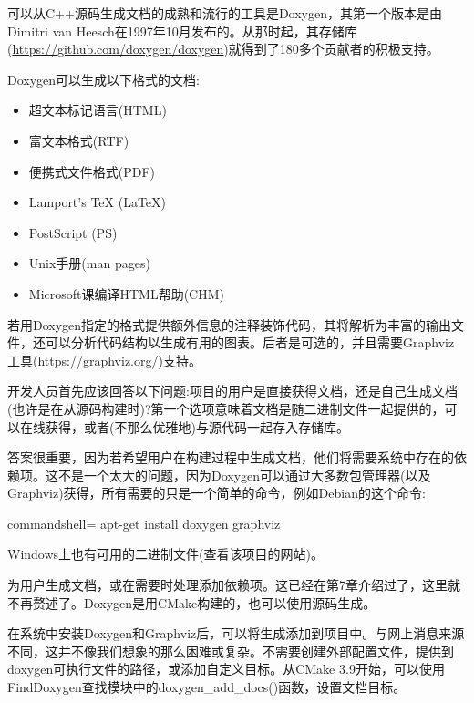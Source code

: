 可以从C++源码生成文档的成熟和流行的工具是Doxygen，其第一个版本是由Dimitri van Heesch在1997年10月发布的。从那时起，其存储库(\url{https://github.com/doxygen/doxygen})就得到了180多个贡献者的积极支持。

Doxygen可以生成以下格式的文档:

\begin{itemize}
\item 
超文本标记语言(HTML)

\item 
富文本格式(RTF)

\item 
便携式文件格式(PDF)

\item 
Lamport's TeX (LaTeX)

\item 
PostScript (PS)

\item 
Unix手册(man pages)

\item 
Microsoft课编译HTML帮助(CHM)
\end{itemize}

若用Doxygen指定的格式提供额外信息的注释装饰代码，其将解析为丰富的输出文件，还可以分析代码结构以生成有用的图表。后者是可选的，并且需要Graphviz工具(\url{https://graphviz.org/})支持。

开发人员首先应该回答以下问题:项目的用户是直接获得文档，还是自己生成文档(也许是在从源码构建时)?第一个选项意味着文档是随二进制文件一起提供的，可以在线获得，或者(不那么优雅地)与源代码一起存入存储库。

答案很重要，因为若希望用户在构建过程中生成文档，他们将需要系统中存在的依赖项。这不是一个太大的问题，因为Doxygen可以通过大多数包管理器(以及Graphviz)获得，所有需要的只是一个简单的命令，例如Debian的这个命令:

\begin{tcblisting}{commandshell={}}
apt-get install doxygen graphviz
\end{tcblisting}

Windows上也有可用的二进制文件(查看该项目的网站)。

为用户生成文档，或在需要时处理添加依赖项。这已经在第7章介绍过了，这里就不再赘述了。Doxygen是用CMake构建的，也可以使用源码生成。

在系统中安装Doxygen和Graphviz后，可以将生成添加到项目中。与网上消息来源不同，这并不像我们想象的那么困难或复杂。不需要创建外部配置文件，提供到doxygen可执行文件的路径，或添加自定义目标。从CMake 3.9开始，可以使用FindDoxygen查找模块中的doxygen\_add\_docs()函数，设置文档目标。

